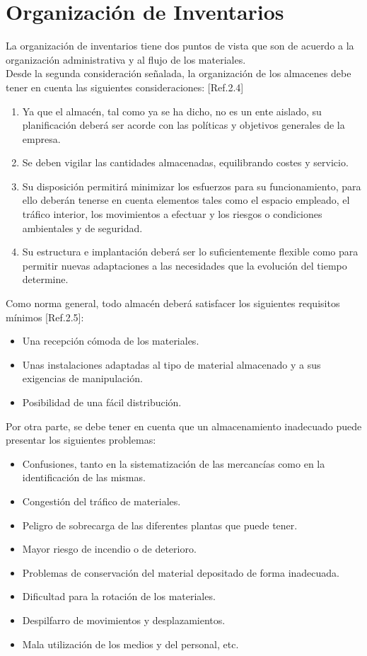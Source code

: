 \section{Organización de Inventarios}
La organización de inventarios tiene dos puntos de vista que son de acuerdo a la organización administrativa y al flujo de los materiales.\\

Desde la segunda consideración señalada, la organización de los almacenes debe tener en cuenta las siguientes consideraciones: [Ref.2.4]\\
\begin{enumerate}
\item Ya que el almacén, tal como ya se ha dicho, no es un ente aislado, su planificación deberá ser acorde con las políticas y objetivos generales de la empresa.
\item Se deben vigilar las cantidades almacenadas, equilibrando costes y servicio.
\item Su disposición permitirá minimizar los esfuerzos para su funcionamiento, para ello deberán tenerse en cuenta elementos tales como el espacio empleado, el tráfico interior, los movimientos a efectuar y los riesgos o condiciones ambientales y de seguridad.
\item Su estructura e implantación deberá ser lo suficientemente flexible como para permitir nuevas adaptaciones a las necesidades que la evolución del tiempo determine.
\end{enumerate}

Como norma general, todo almacén deberá satisfacer los siguientes requisitos mínimos [Ref.2.5]:\\

\begin{itemize}
\item Una recepción cómoda de los materiales.
\item Unas instalaciones adaptadas al tipo de material almacenado y a sus exigencias de manipulación.
\item Posibilidad de una fácil distribución.
\end{itemize}

Por otra parte, se debe tener en cuenta que un almacenamiento inadecuado puede presentar los siguientes problemas:\\
\begin{itemize}
\item Confusiones, tanto en la sistematización de las mercancías como en la identificación de las mismas.
\item Congestión del tráfico de materiales.
\item Peligro de sobrecarga de las diferentes plantas que puede tener.
\item Mayor riesgo de incendio o de deterioro.
\item Problemas de conservación del material depositado de forma inadecuada.
\item Dificultad para la rotación de los materiales.
\item Despilfarro de movimientos y desplazamientos.
\item Mala utilización de los medios y del personal, etc.
\end{itemize}

